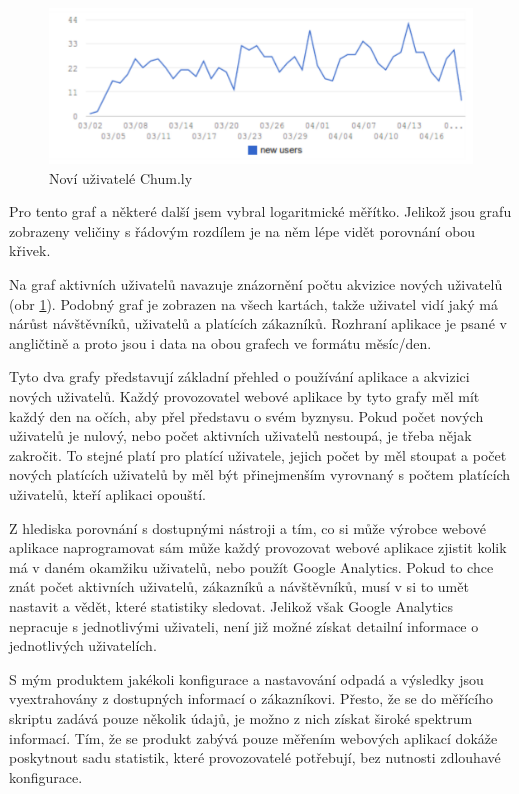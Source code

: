 \documentclass[bc,male,java,dept456]{diploma}						%
\begin{document}
\begin{figure}[h]
	\centering
	\includegraphics[width=13.45cm]{img/ud_new_users.pdf}
	\caption{Noví uživatelé Chum.ly}
	\label{img:chumly_new_users}
\end{figure}

Pro tento graf a některé další jsem vybral logaritmické měřítko. Jelikož jsou grafu zobrazeny veličiny s řádovým rozdílem je na něm lépe vidět porovnání obou křivek.

Na graf aktivních uživatelů navazuje znázornění počtu akvizice nových uživatelů (obr \ref{img:chumly_new_users}). Podobný graf je zobrazen na všech kartách, takže uživatel vidí jaký má nárůst návštěvníků, uživatelů a platících zákazníků. Rozhraní aplikace je psané v angličtině a proto jsou i data na obou grafech ve formátu měsíc/den. 


Tyto dva grafy představují základní přehled o používání aplikace a akvizici nových uživatelů. Každý provozovatel webové aplikace by tyto grafy měl mít každý den na očích, aby přel představu o svém byznysu. Pokud počet nových uživatelů je nulový, nebo počet aktivních uživatelů nestoupá, je třeba nějak zakročit. To stejné platí pro platící uživatele, jejich počet by měl stoupat a počet nových platících uživatelů by měl být přinejmenším vyrovnaný s počtem platících uživatelů, kteří aplikaci opouští.

Z hlediska porovnání s dostupnými nástroji a tím, co si může výrobce webové aplikace naprogramovat sám může každý provozovat webové aplikace zjistit kolik má v daném okamžiku uživatelů, nebo použít Google Analytics. Pokud to chce znát počet aktivních uživatelů, zákazníků a návštěvníků, musí v si to umět nastavit a vědět, které statistiky sledovat. Jelikož však Google Analytics nepracuje s jednotlivými uživateli, není již možné získat detailní informace o jednotlivých uživatelích.

S mým produktem jakékoli konfigurace a nastavování odpadá a výsledky jsou vyextrahovány z dostupných informací o zákazníkovi. Přesto, že se do měřícího skriptu zadává pouze několik údajů, je možno z nich získat široké spektrum informací. Tím, že se produkt zabývá pouze měřením webových aplikací dokáže poskytnout sadu statistik, které provozovatelé potřebují, bez nutnosti zdlouhavé konfigurace.
\end{document}
